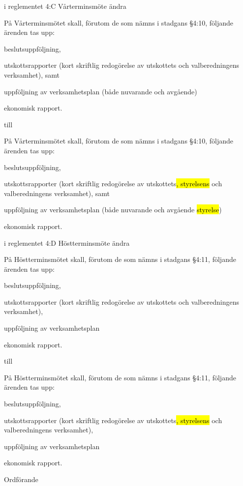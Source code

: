 \documentclass[../_main/handlingar.tex]{subfiles}
\begin{document}
\begin{attsatser}
\newpage

\att i reglementet 4:C Vårterminsmöte ändra 

På Vårterminsmötet skall, förutom de som nämns i stadgans §4:10,
följande ärenden tas upp:
\begin{alphlist}
    \item beslutsuppföljning,
    \item utskottsrapporter (kort skriftlig redogörelse av utskottets och valberedningens verksamhet), samt
    \item uppföljning av verksamhetsplan (både nuvarande och avgående)
    \item ekonomisk rapport.
\end{alphlist}

till 

På Vårterminsmötet skall, förutom de som nämns i stadgans §4:10,
följande ärenden tas upp:
\begin{alphlist}
    \item beslutsuppföljning,
    \item utskottsrapporter (kort skriftlig redogörelse av utskottets\hl{, styrelsens } och valberedningens verksamhet), samt
    \item uppföljning av verksamhetsplan (både nuvarande och avgående \hl{styrelse})
    \item ekonomisk rapport.
\end{alphlist}
\changenote

\newpage

\att i reglementet 4:D Höstterminsmöte ändra


På Höstterminsmötet skall, förutom de som nämns i stadgans §4:11,
följande ärenden tas upp:
\begin{alphlist}
    \item beslutsuppföljning,
    \item utskottsrapporter (kort skriftlig redogörelse av utskottets och valberedningens verksamhet),
   	\item uppföljning av verksamhetsplan
    \item ekonomisk rapport.
\end{alphlist}

till


På Höstterminsmötet skall, förutom de som nämns i stadgans §4:11,
följande ärenden tas upp:
\begin{alphlist}
    \item beslutsuppföljning,
    \item utskottsrapporter (kort skriftlig redogörelse av utskottets\hl{, styrelsens } och valberedningens verksamhet),
   	\item uppföljning av verksamhetsplan
    \item ekonomisk rapport.
\end{alphlist}
\changenote

\end{attsatser}







\begin{signatures}{1}
    \ist
    \signature{\ordf}{Ordförande}

\end{signatures}
\end{document}
